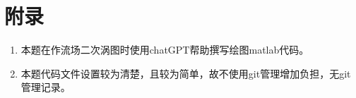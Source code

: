 \documentclass[12pt,a4paper]{article}%
\begin{document}
	\section{附录}
		\begin{enumerate}
			\item 本题在作流场二次涡图时使用chatGPT帮助撰写绘图matlab代码。
			\item 本题代码文件设置较为清楚，且较为简单，故不使用git管理增加负担，无git管理记录。
		\end{enumerate}
	
\end{document}
